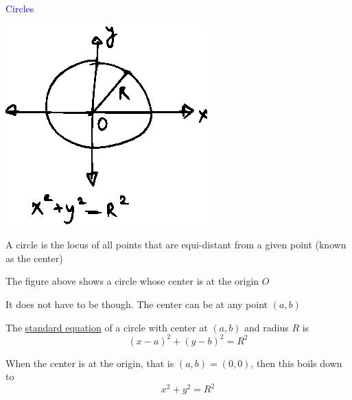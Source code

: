 \documentclass[14pt,fleqn]{extarticle}
\begin{document}
 
\begin{skill}
\textcolor{blue}{Circles}
\end{skill}

\newcard

\begin{center}
\includegraphics[scale=1.5]{circle.eps} 
\end{center} 

A circle is the locus of all points that are equi-distant from a given point (known as the center) \newline 

The figure above shows a circle whose center is at the origin $O$\newline 

It does not have to be though. The center can be at any point $(a,b)$\newline 

The \underline{standard equation} of a circle with center at $(a,b)$ and radius $R$   is 
\[ \qquad \left(x-a \right)^2 + \left(y-b \right)^2 = R^2 \]

When the center is at the origin, that is $(a,b) = (0,0)$, then this boils down to 
\[ \qquad x^2 + y^2 = R^2 \]
\end{document}
